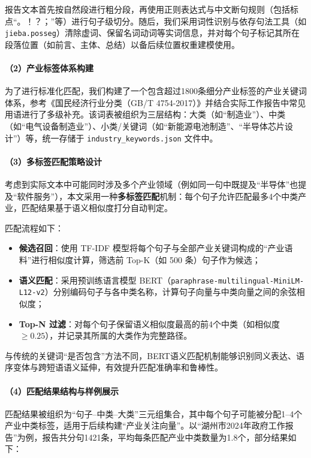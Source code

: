 \documentclass[a4paper,11pt, fontset=fandol]{ctexart}
\begin{document}
报告文本首先按自然段进行粗分段，再使用正则表达式与中文断句规则（包括标点“。！？；”等）进行句子级切分。随后，我们采用词性识别与依存句法工具（如 \texttt{jieba.posseg}）清除虚词、保留名词动词等实词信息，并对每个句子标记其所在段落位置（如前言、主体、总结）以备后续位置权重建模使用。

\paragraph{（2）产业标签体系构建}

为了进行标准化匹配，我们构建了一个包含超过1800条细分产业标签的产业关键词体系，参考《国民经济行业分类（GB/T 4754-2017）》并结合实际工作报告中常见用语进行了多级补充。该词表被组织为三层结构：大类（如“制造业”）、中类（如“电气设备制造业”）、小类/关键词（如“新能源电池制造”、“半导体芯片设计”）等，统一存储于 \texttt{industry\_keywords.json} 文件中。

\paragraph{（3）多标签匹配策略设计}

考虑到实际文本中可能同时涉及多个产业领域（例如同一句中既提及“半导体”也提及“软件服务”），本文采用一种\textbf{多标签匹配}机制：每个句子允许匹配最多4个中类产业，匹配结果基于语义相似度打分自动判定。

匹配流程如下：
\begin{itemize}
    \item \textbf{候选召回}：使用 TF-IDF 模型将每个句子与全部产业关键词构成的“产业语料”进行相似度计算，筛选前 Top-K（如 500 条）句子作为候选；
    \item \textbf{语义匹配}：采用预训练语言模型 BERT（\texttt{paraphrase-multilingual-MiniLM-L12-v2}）分别编码句子与各中类名称，计算句子向量与中类向量之间的余弦相似度；
    \item \textbf{Top-N 过滤}：对每个句子保留语义相似度最高的前4个中类（如相似度 $\geq 0.25$），并记录其所属的大类作为完整路径。
\end{itemize}

与传统的关键词“是否包含”方法不同，BERT语义匹配机制能够识别同义表达、语序变体与跨短语语义延伸，有效提升匹配准确率和鲁棒性。

\paragraph{（4）匹配结果结构与样例展示}

匹配结果被组织为“句子–中类–大类”三元组集合，其中每个句子可能被分配1–4个产业中类标签，适用于后续构建“产业关注向量”。以“湖州市2024年政府工作报告”为例，报告共分句1421条，平均每条匹配产业中类数量为1.8个，部分结果如下：
\end{document}
